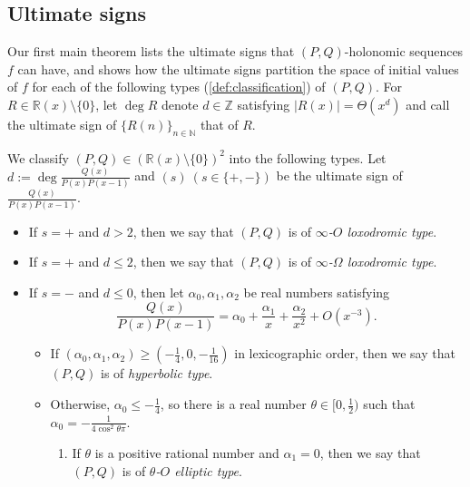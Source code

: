 \documentclass[a4paper,UKenglish,cleveref,autoref,thm-restate]{lipics-v2021}
\newcommand{\R}{\mathbb{R}}
\newcommand{\N}{\mathbb{N}}
\newcommand{\Z}{\mathbb{Z}}
\begin{document}
\subsection{Ultimate signs}
\label{subsection: main result classification}

Our first main theorem lists the ultimate signs that $(P, Q)$-holonomic sequences $f$ can have, and shows how the ultimate signs partition the space of initial values of $f$ for each of the following types (\cref{def:classification}) of $(P, Q)$. For $R \in \R(x) \setminus \{ 0 \}$, let $\deg R$ denote $d \in \Z$ satisfying $|R(x)| = \Theta(x^d)$ and call the ultimate sign of $\{ R(n) \}_{n \in \N}$ that of $R$.

\begin{definition}\label{def:classification}
We classify $(P, Q) \in (\R(x) \setminus \{ 0 \})^2$ into the following types. Let $d := \deg \frac{Q(x)}{P(x)P(x-1)}$ and $(s) \ (s \in \{ +, -\})$ be the ultimate sign of $\frac{Q(x)}{P(x)P(x-1)}$. 

\begin{itemize}
\item If $s = +$ and $d > 2$, then we say that $(P, Q)$ is of \emph{$\infty$-$O$ loxodromic type}.

\item If $s = +$ and $d \leq 2$, then we say that $(P, Q)$ is of \emph{$\infty$-$\Omega$ loxodromic type}.

\item If $s = -$ and $d \leq 0$, then let $\alpha_0, \alpha_1, \alpha_2$ be real numbers satisfying  
\begin{equation}\label{eq:Taylor_ex}
\frac{Q(x)}{P(x)P(x-1)} = \alpha_0 + \frac{\alpha_1}x + \frac{\alpha_2}{x^2} + O(x^{-3}). 
\end{equation}
\begin{itemize}

\item If $(\alpha_0, \alpha_1, \alpha_2) \geq (-\frac{1}{4}, 0, -\frac1{16})$ in lexicographic order, then we say that $(P, Q)$ is of \emph{hyperbolic type}. 

\item Otherwise, $\alpha_0 \leq  -\frac{1}{4}$, so there is a real number $\theta \in [0, \frac12)$ such that $\alpha_0 = -\frac1{4 \cos^2 \theta \pi}$.

\begin{enumerate}[(1)]
\item If $\theta$ is a positive rational number and $\alpha_1 = 0$, then we say that $(P, Q)$ is of \emph{$\theta$-$O$ elliptic type}.


\end{enumerate}
\end{itemize}
\end{itemize}
\end{definition}
\end{document}
